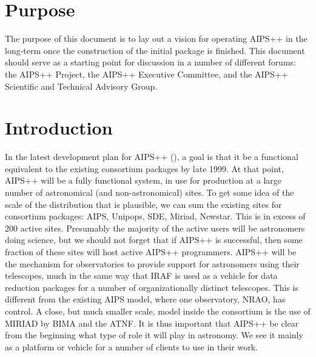 \newcommand{\specsURL}{../../specs/specs.html}
\newcommand{\consortiumURL}{../consortium.html}
%
%

%


\section{Purpose}

The purpose of this document is to lay out a vision for operating
AIPS++ in the long-term once the construction of the initial
package is finished. This document should serve as a starting
point for discussion in a number of different forums: the AIPS++
Project, the AIPS++ Executive Committee, and the AIPS++ Scientific
and Technical Advisory Group.

\section{Introduction}

In the latest development plan for AIPS++ (), a goal is
that it be a functional equivalent to the existing consortium packages
by late 1999. At that point, AIPS++ will be a fully functional system,
in use for production at a large number of astronomical (and
non-astronomical) sites. To get some idea of the scale of the
distribution that is plausible, we can sum the existing sites for
consortium packages: AIPS, Unipops, SDE, Miriad, Newstar. This is in
excess of 200 active sites. Presumably the majority of the active
users will be astronomers doing science, but we should not forget that
if AIPS++ is successful, then some fraction of these sites will host
active AIPS++ programmers. AIPS++ will be the mechanism for
observatories to provide support for astronomers using their
telescopes, much in the same way that IRAF is used as a vehicle for
data reduction packages for a number of organizationally distinct
telescopes. This is different from the existing AIPS model, where one
observatory, NRAO, has control. A close, but much smaller scale, model
inside the consortium is the use of MIRIAD by BIMA and the ATNF.  It
is thus important that AIPS++ be clear from the beginning what type of
role it will play in astronomy. We see it mainly as a platform or
vehicle for a number of clients to use in their work.


